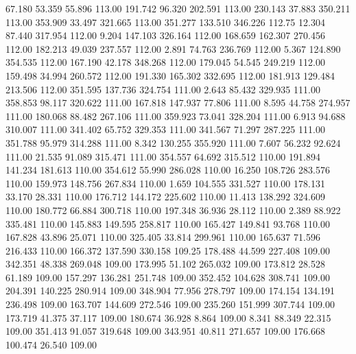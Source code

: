   67.180   53.359   55.896       113.00
 191.742   96.320  202.591       113.00
 230.143   37.883  350.211       113.00
 353.909   33.497  321.665       113.00
 351.277  133.510  346.226       112.75
  12.304   87.440  317.954       112.00
   9.204  147.103  326.164       112.00
 168.659  162.307  270.456       112.00
 182.213   49.039  237.557       112.00
   2.891   74.763  236.769       112.00
   5.367  124.890  354.535       112.00
 167.190   42.178  348.268       112.00
 179.045   54.545  249.219       112.00
 159.498   34.994  260.572       112.00
 191.330  165.302  332.695       112.00
 181.913  129.484  213.506       112.00
 351.595  137.736  324.754       111.00
   2.643   85.432  329.935       111.00
 358.853   98.117  320.622       111.00
 167.818  147.937   77.806       111.00
   8.595   44.758  274.957       111.00
 180.068   88.482  267.106       111.00
 359.923   73.041  328.204       111.00
   6.913   94.688  310.007       111.00
 341.402   65.752  329.353       111.00
 341.567   71.297  287.225       111.00
 351.788   95.979  314.288       111.00
   8.342  130.255  355.920       111.00
   7.607   56.232   92.624       111.00
  21.535   91.089  315.471       111.00
 354.557   64.692  315.512       110.00
 191.894  141.234  181.613       110.00
 354.612   55.990  286.028       110.00
  16.250  108.726  283.576       110.00
 159.973  148.756  267.834       110.00
   1.659  104.555  331.527       110.00
 178.131   33.170   28.331       110.00
 176.712  144.172  225.602       110.00
  11.413  138.292  324.609       110.00
 180.772   66.884  300.718       110.00
 197.348   36.936   28.112       110.00
   2.389   88.922  335.481       110.00
 145.883  149.595  258.817       110.00
 165.427  149.841   93.768       110.00
 167.828   43.896   25.071       110.00
 325.405   33.814  299.961       110.00
 165.637   71.596  216.433       110.00
 166.372  137.590  330.158       109.25
 178.488   44.599  227.408       109.00
 342.351   48.338  269.048       109.00
 173.995   51.102  265.032       109.00
 173.812   28.528   61.189       109.00
 157.297  136.281  251.748       109.00
 352.452  104.628  308.741       109.00
 204.391  140.225  280.914       109.00
 348.904   77.956  278.797       109.00
 174.154  134.191  236.498       109.00
 163.707  144.609  272.546       109.00
 235.260  151.999  307.744       109.00
 173.719   41.375   37.117       109.00
 180.674   36.928    8.864       109.00
   8.341   88.349   22.315       109.00
 351.413   91.057  319.648       109.00
 343.951   40.811  271.657       109.00
 176.668  100.474   26.540       109.00
